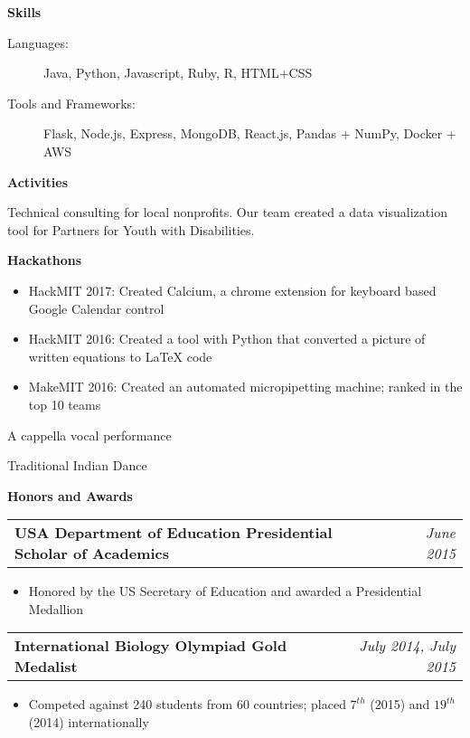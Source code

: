 \documentclass[letterpaper,10pt]{article}
\makeatletter
\newcommand{\resitem}[1]{\item #1 \vspace{-2pt}}
\newcommand{\resheading}[1]{{\large \colorbox{mygrey}{\begin{minipage}{\textwidth}{\textbf{#1 \vphantom{p\^{E}}}}\end{minipage}}}}
\newcommand{\resawards}[2]{
\begin{tabular*}{7.4in}{l@{\extracolsep{\fill}}r}
        \textbf{#1} & \textit{#2} \\
\end{tabular*}\vspace{-6pt}}
\makeatother
\begin{document}
\resheading{Skills}

\begin{description}
\item[Languages:]
Java, Python, Javascript, Ruby, R, HTML+CSS
\item[Tools and Frameworks:]
Flask, Node.js, Express, MongoDB, React.js, Pandas + NumPy, Docker + AWS
\end{description}

\resheading{Activities}

\begin{description}

\item[Code For Good (MIT):]
Technical consulting for local nonprofits. Our team created a data visualization tool for Partners for Youth with Disabilities.

\item

\textbf{Hackathons}

\vspace{-7pt}

    \begin{itemize}[leftmargin=-1mm]
    \resitem{HackMIT 2017: Created Calcium, a chrome extension for keyboard based Google Calendar control}
    \resitem{HackMIT 2016: Created a tool with Python that converted a picture of written equations to LaTeX code}
    \resitem{MakeMIT 2016: Created an automated micropipetting machine; ranked in the top 10 teams}
  \end{itemize}



\item[MIT Resonance]
A cappella vocal performance

\item[MIT Bhangra]
Traditional Indian Dance
\end{description}


\resheading{Honors and Awards}

\begin{description}
\item
  \resawards{USA Department of Education Presidential Scholar of Academics}{June 2015}
  \begin{itemize}[leftmargin=-1mm]
    \resitem{Honored by the US Secretary of Education and awarded a Presidential Medallion}
  \end{itemize}

\item
  \resawards{International Biology Olympiad Gold Medalist}{July 2014, July 2015}
  \begin{itemize}[leftmargin=-1mm]
    \resitem{Competed against 240 students from 60 countries; placed $7^{th}$ (2015) and $19^{th}$ (2014) internationally}
  \end{itemize}


\end{description}
\end{document}

